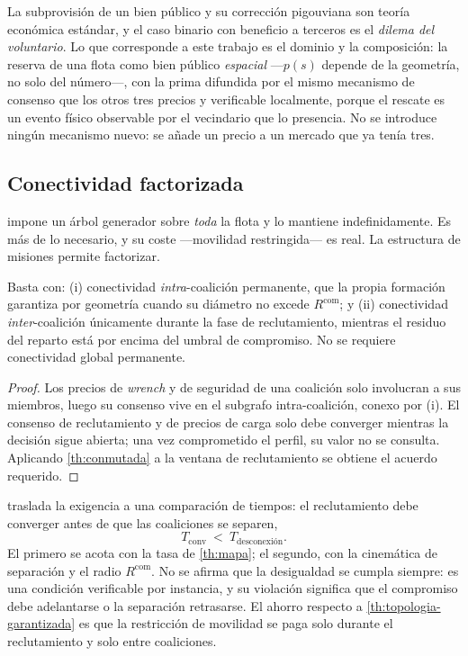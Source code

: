 \begin{observacion}[Atribución]
\label{obs:standby-atrib}
La subprovisión de un bien público y su corrección pigouviana son teoría
económica estándar, y el caso binario con beneficio a terceros es el
\emph{dilema del voluntario}. Lo que corresponde a este trabajo es el dominio y
la composición: la reserva de una flota como bien público \emph{espacial}
—$p(s)$ depende de la geometría, no solo del número—, con la prima difundida
por el mismo mecanismo de consenso que los otros tres precios y verificable
localmente, porque el rescate es un evento físico observable por el vecindario
que lo presencia. No se introduce ningún mecanismo nuevo: se añade un precio a
un mercado que ya tenía tres.
\end{observacion}

\subsection{Conectividad factorizada}

 impone un árbol generador sobre \emph{toda} la
flota y lo mantiene indefinidamente. Es más de lo necesario, y su coste
—movilidad restringida— es real. La estructura de misiones permite factorizar.

\begin{proposicion}
\label{pr:factorizada}
Basta con: (i) conectividad \emph{intra}-coalición permanente, que la propia
formación garantiza por geometría cuando su diámetro no excede
$R^{\mathrm{com}}$; y (ii) conectividad \emph{inter}-coalición únicamente
durante la fase de reclutamiento, mientras el residuo del reparto está por
encima del umbral de compromiso. No se requiere conectividad global permanente.
\end{proposicion}

\begin{proof}
Los precios de \emph{wrench} y de seguridad de una coalición solo involucran a
sus miembros, luego su consenso vive en el subgrafo intra-coalición, conexo por
(i). El consenso de reclutamiento y de precios de carga solo debe converger
mientras la decisión sigue abierta; una vez comprometido el perfil, su valor no
se consulta. Aplicando \cref{th:conmutada} a la ventana de reclutamiento se
obtiene el acuerdo requerido.
\end{proof}

\begin{observacion}
\label{obs:carrera}
 traslada la exigencia a una comparación de tiempos: el
reclutamiento debe converger antes de que las coaliciones se separen,
\[
  T_{\mathrm{conv}}\ <\ T_{\mathrm{desconexión}} .
\]
El primero se acota con la tasa de \cref{th:mapa}; el segundo, con la cinemática
de separación y el radio $R^{\mathrm{com}}$. No se afirma que la desigualdad se
cumpla siempre: es una condición verificable por instancia, y su violación
significa que el compromiso debe adelantarse o la separación retrasarse. El
ahorro respecto a \cref{th:topologia-garantizada} es que la restricción de
movilidad se paga solo durante el reclutamiento y solo entre coaliciones.
\end{observacion}

